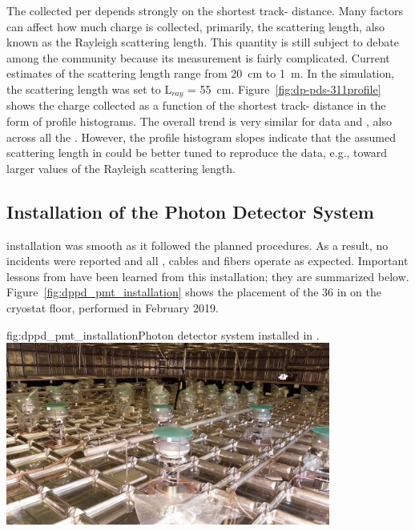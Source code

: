 
The  collected per  depends strongly on the shortest track- distance. Many factors can affect how much charge is collected, primarily, the scattering length, also known as the Rayleigh scattering length. This quantity is still subject to debate among the  community because its measurement is fairly complicated. Current estimates of the scattering length range from \SI{20}{\cm} to \SI{1}{\m}.
In the  simulation, the scattering length was set to L$_{ray}$ = \SI{55}{\cm}.
Figure~\ref{fig:dp-pds-311profile} shows the charge collected as a function of the shortest track- distance in the form of profile histograms. The overall trend is very similar for data and , also across all the . However, the profile histogram slopes indicate that the assumed scattering length in  could be better tuned to reproduce the data, e.g., toward larger values of the Rayleigh scattering length.


\subsection{Installation of the  Photon Detector System}

  installation was smooth as it followed the planned procedures. As a result, no incidents were reported and all , cables and fibers operate as expected. Important lessons from  have been learned from this installation; %
they are summarized below. Figure~\ref{fig:dppd_pmt_installation} shows the placement of the \num{36}  in  on the cryostat floor, performed in February 2019.

\begin{dunefigure}{fig:dppd_pmt_installation}{Photon detector system installed in .}
\includegraphics[width=0.8\textwidth]{graphics/dppd_pmt_installation.jpg}
\end{dunefigure}

